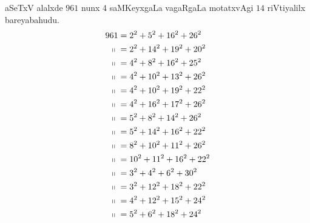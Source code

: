 aSeTxV alalxde $961$ nunx $4$ saMKeyxgaLa vagaRgaLa motatxvAgi $14$ riVtiyalilx bareyabahudu.
\begin{align*}
961 &= 2^2+5^2+16^2+26^2\\
\shortparallel~   &= 2^2+14^2+19^2+20^2\\
\shortparallel~   &= 4^2+8^2+16^2+25^2\\
\shortparallel~   &= 4^2+10^2+13^2+26^2\\
\shortparallel~   &= 4^2+10^2+19^2+22^2\\
\shortparallel~   &= 4^2+16^2+17^2+26^2\\
\shortparallel~   &= 5^2+8^2+14^2+26^2\\
\shortparallel~   &= 5^2+14^2+16^2+22^2\\
\shortparallel~   &= 8^2+10^2+11^2+26^2\\
\shortparallel~   &= 10^2+11^2+16^2+22^2\\
\shortparallel~   &= 3^2+4^2+6^2+30^2\\
\shortparallel~   &= 3^2+12^2+18^2+22^2\\
\shortparallel~   &= 4^2+12^2+15^2+24^2\\
\shortparallel~   &= 5^2+6^2+18^2+24^2
\end{align*}
